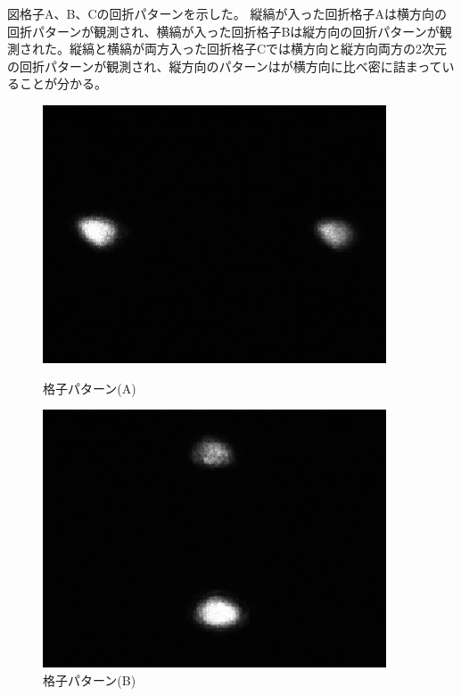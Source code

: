 \documentclass[11pt,a4]{jarticle}
\begin{document}
図格子A、B、Cの回折パターンを示した。
縦縞が入った回折格子Aは横方向の回折パターンが観測され、横縞が入った回折格子Bは縦方向の回折パターンが観測された。縦縞と横縞が両方入った回折格子Cでは横方向と縦方向両方の2次元の回折パターンが観測され、縦方向のパターンはが横方向に比べ密に詰まっていることが分かる。
\begin{figure}[htbp]
 \begin{minipage}{0.33\hsize}
   \begin{center}
    \includegraphics[width=0.9\hsize]{./TypeA.eps}
    \caption{格子パターン(A)}
     \label{fig:TypeA}
   \end{center}
 \end{minipage}
 \begin{minipage}{0.33\hsize}
   \begin{center}
    \includegraphics[width=0.9\hsize]{./TypeB.eps}
    \caption{格子パターン(B)}

\end{center}
\end{minipage}
\end{figure}
\end{document}
